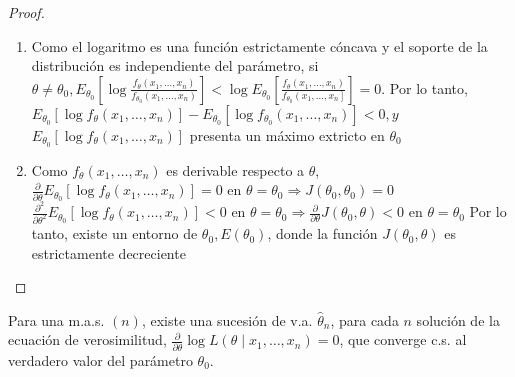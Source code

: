\begin{proof}
  \begin{enumerate}
    \item Como el logaritmo es una función estrictamente cóncava y el soporte de la
          distribución es independiente del parámetro, si $\theta \neq \theta_{0},
            E_{\theta_{0}}\left[\log \frac{f_{\theta}\left(x_{1}, \ldots,
                x_{n}\right)}{f_{\theta_{0}}\left(x_{1}, \ldots, x_{n}\right)}\right]<\log
            E_{\theta_{0}}\left[\frac{f_{\theta}\left(x_{1}, \ldots,
                x_{n}\right)}{f_{\theta_{0}}\left(x_{1}, \ldots, x_{n}\right]}\right]=0$. Por
          lo tanto,\\ $E_{\theta_{0}}\left[\log f_{\theta}\left(x_{1}, \ldots,
              x_{n}\right)\right]-E_{\theta_{0}}\left[\log f_{\theta_{0}}\left(x_{1}, \ldots,
              x_{n}\right)\right]<0, y$\\ $E_{\theta_{0}}\left[\log f_{\theta}\left(x_{1},
              \ldots, x_{n}\right)\right]$ presenta un máximo extricto en $\theta_{0}$
    \item Como $f_{\theta}\left(x_{1}, \ldots, x_{n}\right)$ es derivable respecto a
          $\theta$, $\frac{\partial}{\partial \theta} E_{\theta_{0}}\left[\log
              f_{\theta}\left(x_{1}, \ldots, x_{n}\right)\right]=0$ en $\theta=\theta_{0}
            \Rightarrow J\left(\theta_{0}, \theta_{0}\right)=0$
          $\frac{\partial^{2}}{\partial \theta^{2}} E_{\theta_{0}}\left[\log
              f_{\theta}\left(x_{1}, \ldots, x_{n}\right)\right]<0$ en $\theta=\theta_{0}
            \Rightarrow \frac{\partial}{\partial \theta} J\left(\theta_{0},
            \theta\right)<0$ en $\theta=\theta_{0}$ Por lo tanto, existe un entorno de
          $\theta_{0}, E\left(\theta_{0}\right)$, donde la función $J\left(\theta_{0},
            \theta\right)$ es estrictamente decreciente
  \end{enumerate}
\end{proof}


\begin{teorema} 
  Para una m.a.s. $(n)$, existe una sucesión de v.a. $\hat{\theta}_{n}$, para cada $n$ solución de la ecuación de verosimilitud, $\frac{\partial}{\partial \theta} \log L\left(\theta \mid x_{1}, \ldots, x_{n}\right)=0$, que converge c.s. al verdadero valor del parámetro $\theta_{0}$.
\end{teorema}

